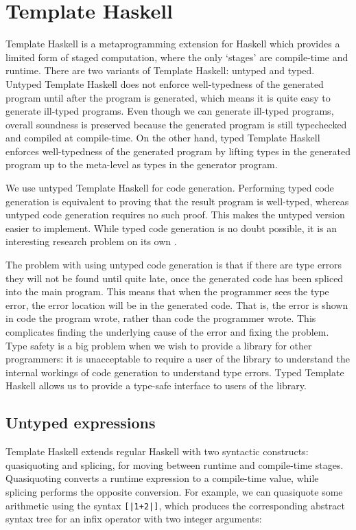 \section{Template Haskell}
Template Haskell is a metaprogramming extension for Haskell \cite{sheard2002template} which provides a limited form of staged computation, where the only `stages' are compile-time and runtime.
There are two variants of Template Haskell: untyped and typed.
Untyped Template Haskell does not enforce well-typedness of the generated program until after the program is generated, which means it is quite easy to generate ill-typed programs.
Even though we can generate ill-typed programs, overall soundness is preserved because the generated program is still typechecked and compiled at compile-time.
On the other hand, typed Template Haskell enforces well-typedness of the generated program by lifting types in the generated program up to the meta-level as types in the generator program.

We use untyped Template Haskell for code generation.
Performing typed code generation is equivalent to proving that the result program is well-typed, whereas untyped code generation requires no such proof.
This makes the untyped version easier to implement.
While typed code generation is no doubt possible, it is an interesting research problem on its own .

The problem with using untyped code generation is that if there are type errors they will not be found until quite late, once the generated code has been spliced into the main program.
This means that when the programmer sees the type error, the error location will be in the generated code.
That is, the error is shown in code the program wrote, rather than code the programmer wrote.
This complicates finding the underlying cause of the error and fixing the problem.
Type safety is a big problem when we wish to provide a library for other programmers: it is unacceptable to require a user of the library to understand the internal workings of code generation to understand type errors.
Typed Template Haskell allows us to provide a type-safe interface to users of the library.

\subsection{Untyped expressions}

Template Haskell extends regular Haskell with two syntactic constructs: quasiquoting and splicing, for moving between runtime and compile-time stages.
Quasiquoting converts a runtime expression to a compile-time value, while splicing performs the opposite conversion.
For example, we can quasiquote some arithmetic using the syntax \lstinline/[|1+2|]/, which produces the corresponding abstract syntax tree for an infix operator with two integer arguments:

